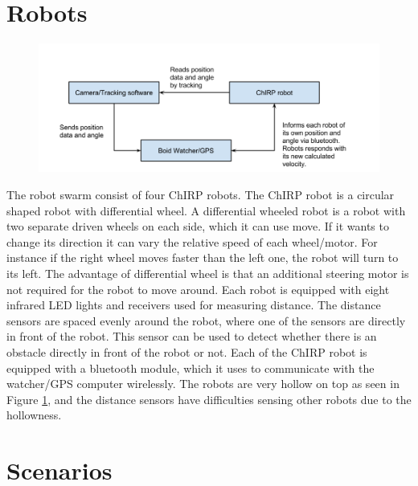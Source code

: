 \section{Robots}
\label{sec:robot}
\begin{figure}[h]
\label{fig:robot}
\begin{center}
\includegraphics[width=0.8\linewidth]{figs/system_overview}
\end{center}
\end{figure}

The robot swarm consist of four ChIRP robots. The ChIRP robot is a circular shaped robot with differential wheel. A differential wheeled robot is a robot with two separate driven wheels on each side, which it can use move. If it wants to change its direction it can vary the relative speed of each wheel/motor. For instance if the right wheel moves faster than the left one, the robot will turn to its left. The advantage of differential wheel is that an additional steering motor is not required for the robot to move around.
Each robot is equipped with eight infrared LED lights and receivers used for measuring distance. The distance sensors are spaced evenly around the robot, where one of the sensors are directly in front of the robot. This sensor can be used to detect whether there is an obstacle directly in front of the robot or not.
Each of the ChIRP robot is equipped with a bluetooth module, which it uses to communicate with the watcher/GPS computer wirelessly. 
The robots are very hollow on top as seen in Figure \ref{fig:robot}, and the distance sensors have difficulties sensing other robots due to the hollowness.


\section{Scenarios}
\label{sec:scenario}


